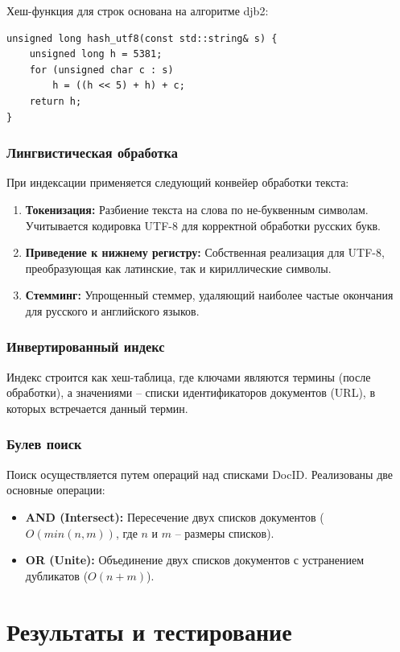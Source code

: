 Хеш-функция для строк основана на алгоритме djb2:
\begin{verbatim}
unsigned long hash_utf8(const std::string& s) {
    unsigned long h = 5381;
    for (unsigned char c : s) 
        h = ((h << 5) + h) + c;
    return h;
}
\end{verbatim}

\subsubsection{Лингвистическая обработка}
При индексации применяется следующий конвейер обработки текста:
\begin{enumerate}
    \item \textbf{Токенизация:} Разбиение текста на слова по не-буквенным символам. Учитывается кодировка UTF-8 для корректной обработки русских букв.
    \item \textbf{Приведение к нижнему регистру:} Собственная реализация для UTF-8, преобразующая как латинские, так и кириллические символы.
    \item \textbf{Стемминг:} Упрощенный стеммер, удаляющий наиболее частые окончания для русского и английского языков.
\end{enumerate}

\subsubsection{Инвертированный индекс}
Индекс строится как хеш-таблица, где ключами являются термины (после обработки), а значениями -- списки идентификаторов документов (URL), в которых встречается данный термин.

\subsubsection{Булев поиск}
Поиск осуществляется путем операций над списками DocID. Реализованы две основные операции:
\begin{itemize}
    \item \textbf{AND (Intersect):} Пересечение двух списков документов ($O(min(n,m))$, где $n$ и $m$ -- размеры списков).
    \item \textbf{OR (Unite):} Объединение двух списков документов с устранением дубликатов ($O(n + m)$).
\end{itemize}

\section{Результаты и тестирование}

